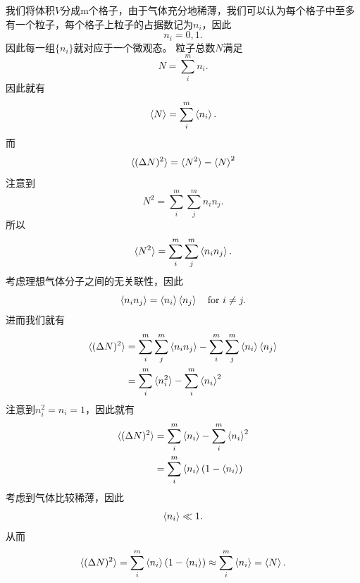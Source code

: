 我们将体积$V$分成m个格子，由于气体充分地稀薄，我们可以认为每个格子中至多有一个粒子，每个格子上粒子的占据数记为$n_i$，因此\begin{equation}
    n_i=0,1.
\end{equation}
因此每一组$\{n_i\}$就对应于一个微观态。
粒子总数$N$满足\begin{equation}
    N=\sum_i^m n_i.
\end{equation}
因此就有\begin{equation}
    \braket{N}=\sum_i^m \braket{n_i}.
\end{equation}
而\begin{equation}
    \braket{(\Delta N)^2} =\braket{N^2}-\braket{N}^2
\end{equation}
注意到\begin{equation}
    N^2=\sum_i^m \sum_j^m n_i n_j.
\end{equation}
所以 \begin{equation}
    \braket{N^2}= \sum_i^m \sum_j^m \braket{n_i n_j}.
\end{equation}
考虑理想气体分子之间的无关联性，因此\begin{equation}
    \braket{n_i n_j}= \braket{n_i}\braket{n_j} \quad \text{for}\ i\neq j.
\end{equation}
进而我们就有\begin{equation}
    \begin{aligned}
        \braket{(\Delta N)^2} & =\sum_i^m \sum_j^m \braket{n_i n_j}-\sum_i^m \sum_j^m \braket{n_i}\braket{n_j} \\
                              & =\sum_i^m  \braket{n_i^2}-\sum_i^m \braket{n_i}^2                              \\
    \end{aligned}
\end{equation}
注意到$n_i^2=n_i=1$，因此就有 \begin{equation}
    \begin{aligned}
        \braket{(\Delta N)^2} & =\sum_i^m  \braket{n_i}-\sum_i^m \braket{n_i}^2 \\
                              & =\sum_i^m  \braket{n_i}(1- \braket{n_i})        \\
    \end{aligned}
\end{equation}
考虑到气体比较稀薄，因此\begin{equation}
    \braket{n_i}\ll 1.
\end{equation}
从而\begin{equation}
    \braket{(\Delta N)^2}= \sum_i^m  \braket{n_i}(1- \braket{n_i})    \approx \sum_i^m  \braket{n_i}=\braket{N}.
\end{equation}
